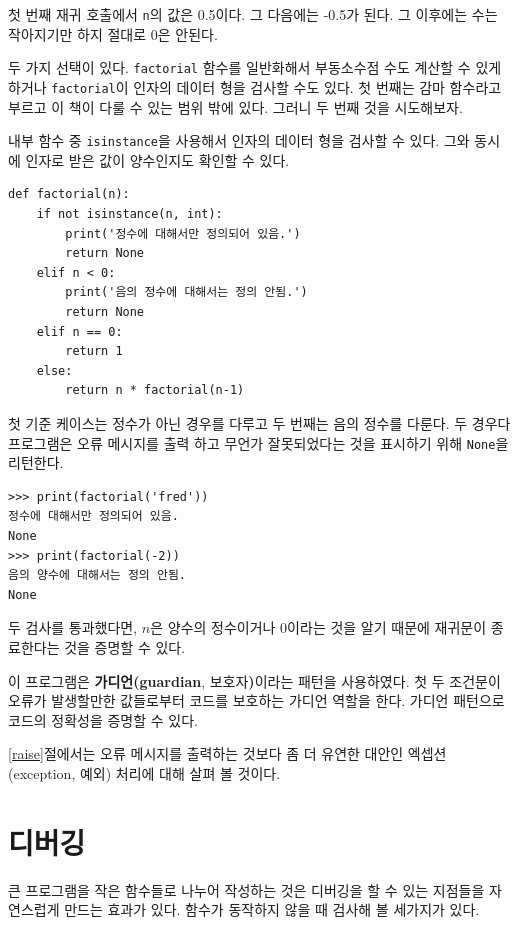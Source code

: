 \documentclass[10pt]{book}
\begin{document}
첫 번째 재귀 호출에서 {\tt n}의 값은 0.5이다.  그 다음에는 -0.5가
된다.  그 이후에는 수는 작아지기만 하지 절대로 0은 안된다.

두 가지 선택이 있다.  {\tt factorial} 함수를 일반화해서 부동소수점 수도
계산할 수 있게 하거나 {\tt factorial}이 인자의 데이터 형을 검사할 수도
있다.  첫 번째는 감마 함수라고 부르고 이 책이 다룰 수 있는 범위 밖에
있다.  그러니 두 번째 것을 시도해보자.

내부 함수 중 {\tt isinstance}을 사용해서 인자의 데이터 형을 검사할 수
있다.  그와 동시에 인자로 받은 값이 양수인지도 확인할 수 있다.

\begin{verbatim}
def factorial(n):
    if not isinstance(n, int):
        print('정수에 대해서만 정의되어 있음.')
        return None
    elif n < 0:
        print('음의 정수에 대해서는 정의 안됨.')
        return None
    elif n == 0:
        return 1
    else:
        return n * factorial(n-1)
\end{verbatim}
%
첫 기준 케이스는 정수가 아닌 경우를 다루고 두 번째는 음의 정수를
다룬다.  두 경우다 프로그램은 오류 메시지를 출력 하고 무언가
잘못되었다는 것을 표시하기 위해 {\tt None}을 리턴한다.


\begin{verbatim}
>>> print(factorial('fred'))
정수에 대해서만 정의되어 있음.
None
>>> print(factorial(-2))
음의 양수에 대해서는 정의 안됨.
None
\end{verbatim}
% 
두 검사를 통과했다면, $n$은 양수의 정수이거나 0이라는 것을 알기 때문에
재귀문이 종료한다는 것을 증명할 수 있다.

이 프로그램은 {\bf 가디언(guardian}, 보호자{\bf)}이라는 패턴을
사용하였다.  첫 두 조건문이 오류가 발생할만한 값들로부터 코드를
보호하는 가디언 역할을 한다.  가디언 패턴으로 코드의 정확성을 증명할 수
있다. 

\ref{raise}절에서는 오류 메시지를 출력하는 것보다 좀 더 유연한 대안인
엑셉션(exception, 예외) 처리에 대해 살펴 볼 것이다.


\section{디버깅}
\label{factdebug}
큰 프로그램을 작은 함수들로 나누어 작성하는 것은 디버깅을 할 수 있는
지점들을 자연스럽게 만드는 효과가 있다.  함수가 동작하지 않을 때 검사해
볼 세가지가 있다.  
\end{document}
